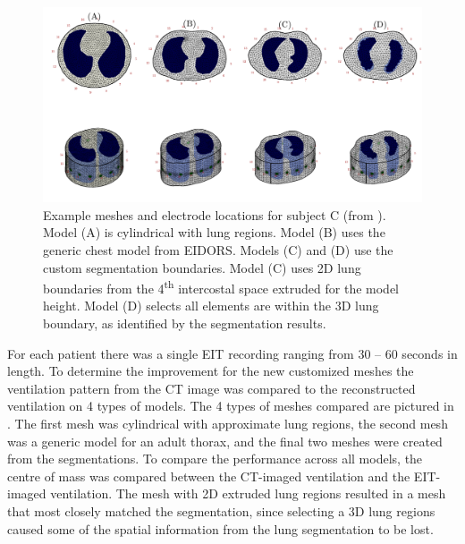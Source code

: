 \begin{figure}[H]
	\centering
	\includegraphics[width=\textwidth]{chapter5-CT_to_mesh/imgs/fem_models_PT04.pdf}
	\caption[Custom and generic meshes]{\label{fig:fem-results}%
	Example meshes and electrode locations for subject C (from ).
	Model (A) is cylindrical with lung regions. Model (B) uses the generic chest model from EIDORS. 
	Models (C) and (D) use the custom segmentation boundaries. Model (C) uses 2D lung boundaries 
	from the 4\textsuperscript{th} intercostal space extruded for the model height. Model (D) selects all elements
	are within the 3D lung boundary, as identified by the segmentation results.
	}
\end{figure}

For each patient there was a single EIT recording ranging from 30 -- 60 seconds in length.
To determine the improvement for the new customized meshes the ventilation pattern 
from the CT image was compared to the reconstructed ventilation on 4 types of models.
The 4 types of meshes compared are pictured in . The first mesh was
cylindrical with approximate lung regions, the second mesh was a generic model 
for an adult thorax, and the final two meshes were created from the segmentations. 
To compare the performance across all models, the centre of mass  was 
compared between the CT-imaged ventilation and the EIT-imaged ventilation.
The mesh with 2D extruded lung regions resulted in a mesh that most closely matched 
the segmentation, since selecting a 3D lung regions caused some of the
spatial information from the lung segmentation to be lost.

